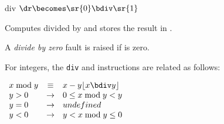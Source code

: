 \begin{instruction}{div}\label{inst:div}
    {$\dr \becomes \sr{0} \bdiv \sr{1}$}
    {Computes  divided by  and stores the result in \dr.

    A \emph{divide by zero} fault is raised if  is zero.

    For integers, the \texttt{div} and  instructions
    are related as follows:

    \begin{math}
      \begin{array}{lcl}
        x \bmod y & \equiv  & x - y \lfloor {x \bdiv y} \rfloor \\
        y > 0 & \rightarrow & 0 \leq x \bmod y < y \\
        y = 0 & \rightarrow & undefined \\
        y < 0 & \rightarrow & y < x \bmod y \leq 0 \\
      \end{array}
    \end{math}}
\end{instruction}


%
%


